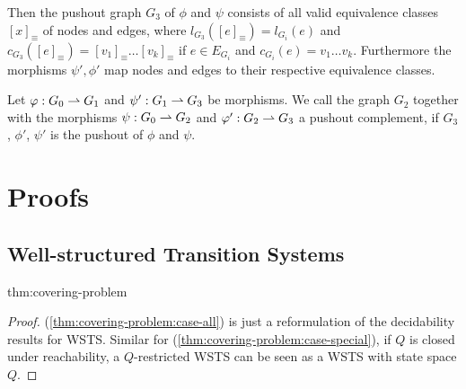 \documentclass{llncs}
\begin{document}
{\begin{proposition}
  Then the pushout graph $G_3$ of $\phi$ and $\psi$ consists of all
  valid equivalence classes $[x]_\equiv$ of nodes and edges, where
  $l_{G_3}([e]_\equiv) = l_{G_i}(e)$ and $c_{G_3}([e]_\equiv) =
  [v_1]_\equiv \dots [v_k]_\equiv$ if $e\in E_{G_i}$ and $c_{G_i}(e) =
  v_1\dots v_k$. Furthermore the morphisms $\psi',\phi'$ map nodes and
  edges to their respective equivalence classes.
\end{proposition}

\begin{definition}
  Let $\varphi : G_0 \rightharpoonup G_1$ and $\psi' : G_1 \rightharpoonup G_3$ be morphisms.
  We call the graph $G_2$ together with the morphisms $\psi : G_0 \rightharpoonup
  G_2$ and $\varphi' : G_2 \rightharpoonup G_3$ a pushout complement, if $G_3$,
  $\phi'$, $\psi'$ is the pushout of $\phi$ and $\psi$.
\end{definition}

\section{Proofs}
\label{sec:proofs}

\subsection{Well-structured Transition Systems}

\begin{theorem_app}[\thmCoveringProblemTitle]{thm:covering-problem}
  \thmCoveringProblem
\end{theorem_app}

\begin{proof}
  (\ref{thm:covering-problem:case-all}) is just a reformulation of the
  decidability results for WSTS. Similar for
  (\ref{thm:covering-problem:case-special}), if $Q$ is closed under
  reachability, a $Q$-restricted WSTS can be seen as a WSTS with state
  space $Q$.



\end{proof}}
\end{document}
